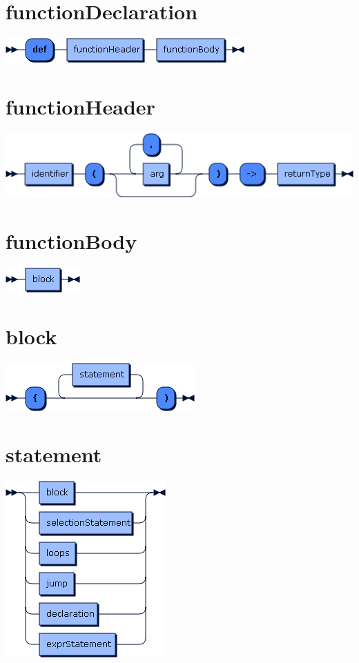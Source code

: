 \begin{appendices}
\section*{functionDeclaration}\includegraphics[scale=0.7]{img/ebnf_grammar/functionDeclaration}
\section*{functionHeader}\includegraphics[scale=0.7]{img/ebnf_grammar/functionHeader}
\section*{functionBody}\includegraphics[scale=0.7]{img/ebnf_grammar/functionBody}
\section*{block}\includegraphics[scale=0.7]{img/ebnf_grammar/block}
\section*{statement}\includegraphics[scale=0.7]{img/ebnf_grammar/statement}

\end{appendices}
